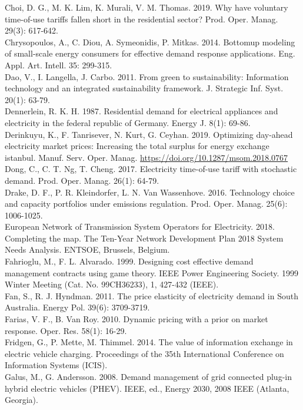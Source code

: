 \documentclass[10pt]{article}
\begin{document}
Choi, D. G., M. K. Lim, K. Murali, V. M. Thomas. 2019. Why have voluntary time-of-use tariffs fallen short in the residential sector? Prod. Oper. Manag. 29(3): 617-642.\\
Chrysopoulos, A., C. Diou, A. Symeonidis, P. Mitkas. 2014. Bottomup modeling of small-scale energy consumers for effective demand response applications. Eng. Appl. Art. Intell. 35: 299-315.\\
Dao, V., I. Langella, J. Carbo. 2011. From green to sustainability: Information technology and an integrated sustainability framework. J. Strategic Inf. Syst. 20(1): 63-79.\\
Dennerlein, R. K. H. 1987. Residential demand for electrical appliances and electricity in the federal republic of Germany. Energy J. 8(1): 69-86.\\
Derinkuyu, K., F. Tanrisever, N. Kurt, G. Ceyhan. 2019. Optimizing day-ahead electricity market prices: Increasing the total surplus for energy exchange istanbul. Manuf. Serv. Oper. Manag. \href{https://doi.org/10.1287/msom.2018.0767}{https://doi.org/10.1287/msom.2018.0767}\\
Dong, C., C. T. Ng, T. Cheng. 2017. Electricity time-of-use tariff with stochastic demand. Prod. Oper. Manag. 26(1): 64-79.\\
Drake, D. F., P. R. Kleindorfer, L. N. Van Wassenhove. 2016. Technology choice and capacity portfolios under emissions regulation. Prod. Oper. Manag. 25(6): 1006-1025.\\
European Network of Transmission System Operators for Electricity. 2018. Completing the map. The Ten-Year Network Development Plan 2018 System Needs Analysis. ENTSOE, Brussels, Belgium.\\
Fahrioglu, M., F. L. Alvarado. 1999. Designing cost effective demand management contracts using game theory. IEEE Power Engineering Society. 1999 Winter Meeting (Cat. No. 99CH36233), 1, 427-432 (IEEE).\\
Fan, S., R. J. Hyndman. 2011. The price elasticity of electricity demand in South Australia. Energy Pol. 39(6): 3709-3719.\\
Farias, V. F., B. Van Roy. 2010. Dynamic pricing with a prior on market response. Oper. Res. 58(1): 16-29.\\
Fridgen, G., P. Mette, M. Thimmel. 2014. The value of information exchange in electric vehicle charging. Proceedings of the 35th International Conference on Information Systems (ICIS).\\
Galus, M., G. Andersson. 2008. Demand management of grid connected plug-in hybrid electric vehicles (PHEV). IEEE, ed., Energy 2030, 2008 IEEE (Atlanta, Georgia).\\
\end{document}
